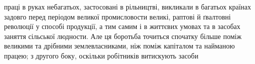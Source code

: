 праці в руках небагатьох, застосовані в рільництві, викликали
в багатьох країнах задовго перед періодом великої промисловости
великі, раптові й ґвалтовні революції у способі продукції, а тим
самим і в життєвих умовах та в засобах заняття сільської людности.
Але ця боротьба точиться спочатку більше поміж великими
та дрібними землевласниками, ніж поміж капіталом та найманою
працею; з другого боку, оскільки робітників витискують засоби